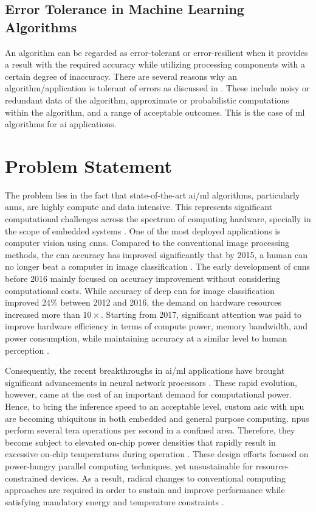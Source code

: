\subsection{Error Tolerance in Machine Learning Algorithms}
An algorithm can be regarded as error-tolerant or error-resilient when it provides a result with the required accuracy while utilizing processing components with a certain degree of inaccuracy. There are several reasons why an algorithm/application is tolerant of errors as discussed in \cite{chippa2013analysis}. These include noisy or redundant data of the algorithm, approximate or probabilistic computations within the algorithm, and a range of acceptable outcomes. This is the case of \gls{ml} algorithms for \gls{ai} applications.

\section{Problem Statement}
The problem lies in the fact that state-of-the-art \gls{ai}/\gls{ml} algorithms, particularly \glspl{ann}, are highly compute and data intensive. This represents significant computational challenges across the spectrum of computing hardware, specially in the scope of embedded systems \cite{venkataramani2016efficient}. One of the most deployed applications is computer vision using \glspl{cnn}. Compared to the conventional image processing methods, the \gls{cnn} accuracy has improved significantly that by 2015, a human can no longer beat a computer in image classification \cite{loh20201}. The early development of \glspl{cnn} before 2016 mainly focused on accuracy improvement without considering computational costs. While accuracy of deep \gls{cnn} for image classification improved 24\% between 2012 and 2016, the demand on hardware resources increased more than $10\times$. Starting from 2017, significant attention was paid to improve hardware efficiency in terms of compute power, memory bandwidth, and power consumption, while maintaining accuracy at a similar level to human perception \cite{venkataramani2016efficient}.

Consequently, the recent breakthroughs in \gls{ai}/\gls{ml} applications have brought significant advancements in neural network processors \cite{jouppi2017datacenter}. These rapid evolution, however, came at the cost of an important demand for computational power. Hence, to bring the inference speed to an acceptable level, custom \gls{asic} with \gls{npu} are becoming ubiquitous in both embedded and general purpose computing. \glspl{npu} perform several tera operations per second in a confined area. Therefore, they become subject to elevated on-chip power densities that rapidly result in excessive on-chip temperatures during operation \cite{amrouch2020npu}.
These design efforts focused on power-hungry parallel computing techniques, yet unsustainable for resource-constrained devices.
As a result, radical changes to conventional computing approaches are required in order to sustain and improve performance while satisfying mandatory energy and temperature constraints \cite{gillani2020exploiting}.

